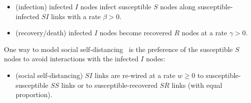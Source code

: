 \documentclass[12pt]{article}
\begin{document}
\begin{itemize}
 \item (infection) infected $I$ nodes infect susceptible $S$ nodes along susceptible-infected $SI$ links with a rate $\beta>0$.
 \item (recovery/death) infected $I$ nodes become recovered $R$ nodes at a rate $\gamma>0$. 
\end{itemize}
 
One way to model social self-distancing~\cite{GrossDLimaBlasius,ShawSchwartz} is the preference of the susceptible $S$ nodes to avoid interactions with the infected $I$ nodes:

\begin{itemize}
 \item (social self-distancing) $SI$ links are re-wired at a rate $w\geq 0$ to susceptible-susceptible $SS$ links or to susceptible-recovered $SR$ links (with equal proportion).
\end{itemize}
\end{document}
